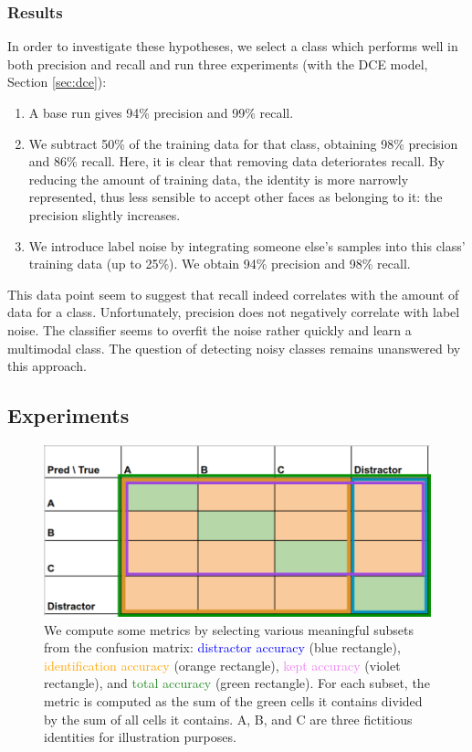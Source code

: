 \subsubsection{Results}

In order to investigate these hypotheses, we select a class which performs well in both precision and recall and run three experiments (with the DCE model, Section \ref{sec:dce}):

\begin{enumerate}
    \item A base run gives 94\% precision and 99\% recall.
    \item We subtract 50\% of the training data for that class, obtaining 98\% precision and 86\% recall. Here, it is clear that removing data deteriorates recall. By reducing the amount of training data, the identity is more narrowly represented, thus less sensible to accept other faces as belonging to it: the precision slightly increases.
    \item We introduce label noise by integrating someone else's samples into this class' training data (up to 25\%). We obtain 94\% precision and 98\% recall.
\end{enumerate}

This data point seem to suggest that recall indeed correlates with the amount of data for a class. Unfortunately, precision does not negatively correlate with label noise. The classifier seems to overfit the noise rather quickly and learn a multimodal class. The question of detecting noisy classes remains unanswered by this approach.

\subsection{Experiments}

\begin{figure}
    \centering
    \includegraphics[width=0.6\columnwidth]{50-files/cm.png}
    \caption{We compute some metrics by selecting various meaningful subsets from the confusion matrix: \textcolor{blue}{distractor accuracy} (blue rectangle), \textcolor{orange}{identification accuracy} (orange rectangle), \textcolor{violet}{kept accuracy} (violet rectangle), and \textcolor{ForestGreen}{total accuracy} (green rectangle). For each subset, the metric is computed as the sum of the green cells it contains divided by the sum of all cells it contains. A, B, and C are three fictitious identities for illustration purposes.}
    \label{fig:cm-metrics}
\end{figure}


